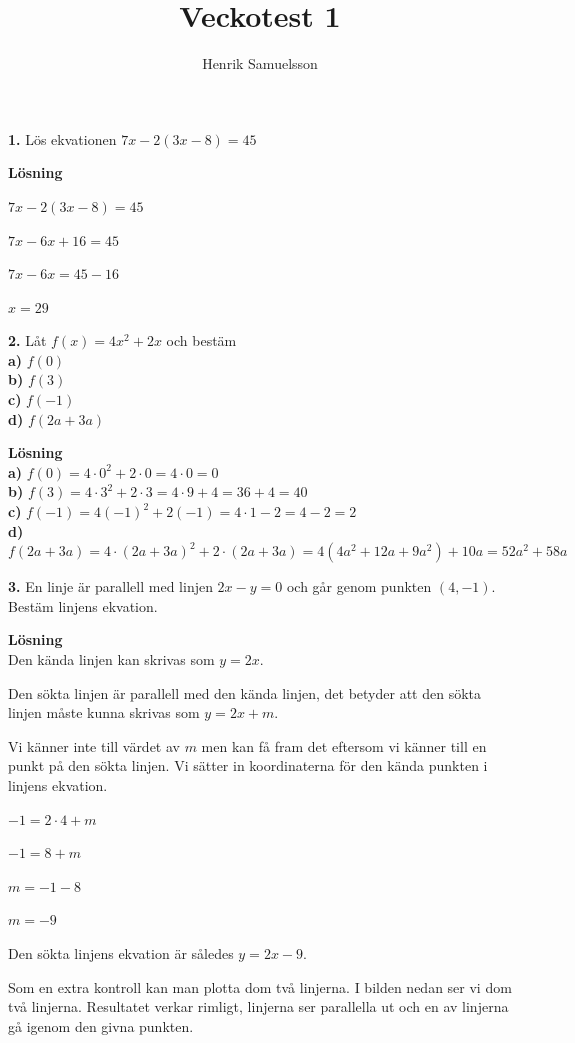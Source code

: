 \documentclass{article}
\begin{document}
\title{Veckotest 1}
\author{Henrik Samuelsson}
\maketitle
\textbf{1.} Lös ekvationen $7x-2(3x-8)=45$

\textbf{Lösning}

$7x-2(3x-8)=45$

$7x-6x+16=45$

$7x-6x=45-16$

$x=29$

\textbf{2.} Låt $f(x)=4x^{2}+2x$ och bestäm\\
\textbf{a)} $f(0)$\\
\textbf{b)} $f(3)$\\
\textbf{c)} $f(-1)$\\
\textbf{d)} $f(2a + 3a)$

\textbf{Lösning}\\
\textbf{a)} $f(0)=4\cdot0^2+2\cdot0=4\cdot0=0$\\
\textbf{b)} $f(3)=4\cdot3^2+2\cdot3=4\cdot9+4=36+4=40$\\
\textbf{c)} $f(-1)=4(-1)^2+2(-1)=4\cdot1-2=4-2=2$\\
\textbf{d)} $f(2a+3a)=4\cdot(2a+3a)^2+2\cdot(2a+3a)=4(4a^2+12a+9a^2)+10a=52a^2+58a$

\textbf{3.} En linje är parallell med linjen $2x - y = 0$ och går genom punkten $(4, -1)$. Bestäm linjens ekvation.

\textbf{Lösning}\\
Den kända linjen kan skrivas som $y = 2x$.

Den sökta linjen är parallell med den kända linjen, det betyder att den sökta linjen måste kunna skrivas som $y = 2x + m$.

Vi känner inte till värdet av $m$ men kan få fram det eftersom vi känner till en punkt på den sökta linjen. Vi sätter in koordinaterna för den kända punkten i linjens ekvation.

$-1 = 2 \cdot 4 + m$

$-1 = 8 + m$

$m = -1 - 8$

$m = -9$

Den sökta linjens ekvation är således $y = 2x - 9$.

Som en extra kontroll kan man plotta dom två linjerna. I bilden nedan ser vi dom två linjerna. Resultatet verkar rimligt, linjerna ser parallella ut och en av linjerna gå igenom den givna punkten. 
\end{document}
